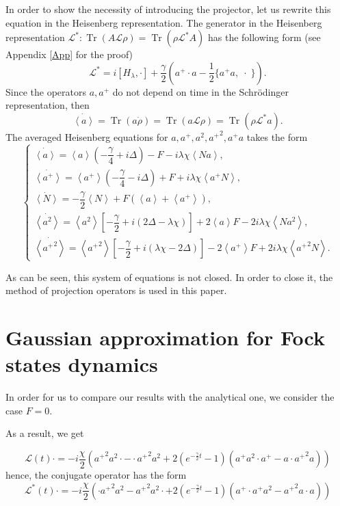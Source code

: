\documentclass[12pt]{article}
\theoremstyle{definition}
\newcommand\Tr{\operatorname{Tr}}
\newcommand\bra{\left<}
\newcommand\ket{\right>}
\newcommand{\braket}[1]{\bra#1\ket}
\def\DE {\Delta}
\def\ga {\gamma}
\def\la {\lambda}
\begin{document}
	In order to show the necessity of introducing the projector, let us rewrite this equation in the Heisenberg representation.	The generator in the Heisenberg representation $\mathcal{L}^*: \Tr(A\mathcal{L}\rho) = \Tr(\rho\mathcal{L}^*A)$ has the following form (see Appendix \ref{App} for the proof)
	\begin{equation}
		\label{eq:Lst}
		\mathcal{L}^* = i[H_{\la},\cdot]  + \dfrac{\ga}{2}(a^+\cdot a - \dfrac{1}{2}\{a^+a, \; \cdot \;\}).
	\end{equation}
	Since the operators $a, a^+$ do not depend on time in the Schrödinger representation, then
	\begin{equation}
		\label{eq:DinOfAv}
		\dot{\braket{a}} = \Tr(a\dot{\rho}) = \Tr(a\mathcal{L}\rho) = \Tr(\rho\mathcal{L}^*a).
	\end{equation}
	The averaged Heisenberg equations  for $a, a^+, a^2, {a^+}^2, a^+a$ takes the form
	\begin{equation}
		\label{eq:FinDinOfAv}
		\left\{\begin{array}{llll}
			\dot{\braket{a}} = \braket{a}(-\dfrac{\ga}{4} + i\DE) - F - i\la\chi\braket{Na},\\
			\dot{\braket{a^+}} = \braket{a^+}(-\dfrac{\ga}{4} - i\DE) + F + i\la\chi\braket{a^+N},\\
			\dot{\braket{N}} = -\dfrac{\ga}{2}\braket{N} + F(\braket{a} + \braket{a^+}),\\
			\dot{\braket{a^2}} = \braket{a^2}[-\dfrac{\ga}{2} + i(2\DE - \la\chi)] + 2\braket{a}F - 2i\la\chi\braket{Na^2},\\
			\dot{\braket{{a^+}^2}} = \braket{{a^+}^2}[-\dfrac{\ga}{2} + i(\la\chi - 2\DE)] - 2\braket{a^+}F + 2i\la\chi\braket{{a^+}^2N}.
		\end{array}
		\right.
	\end{equation}
	
	As can be seen, this system of equations is not closed. In order to close it, the method of projection operators is used in this paper.
	
	\section{Gaussian approximation for Fock states dynamics\label{sec:feq0}}
	
	In order for us to compare our results with the analytical one, we consider the case $F = 0$.
	
	As a result, we get
	
	\begin{equation}
		\label{eq:InterRep}
		\mathcal{L}(t)\cdot = -i\frac{\chi}{2}({a^+}^2a^2\cdot - \cdot{a^+}^2a^2 + 2   (e^{-\frac{\ga}{2}t} - 1) (a^+a^2\cdot a^+ - a\cdot {a^+}^2a) )
	\end{equation}
	hence, the conjugate operator has the form
	\begin{equation}
		\label{eq:InterRepCon}
		\mathcal{L}^*(t)\cdot = -i\frac{\chi}{2}(\cdot{a^+}^2a^2 - {a^+}^2a^2\cdot + 2   (e^{-\frac{\ga}{2}t} - 1) ( a^+\cdot a^+a^2 - {a^+}^2a\cdot a) )
	\end{equation}
	
\end{document}
